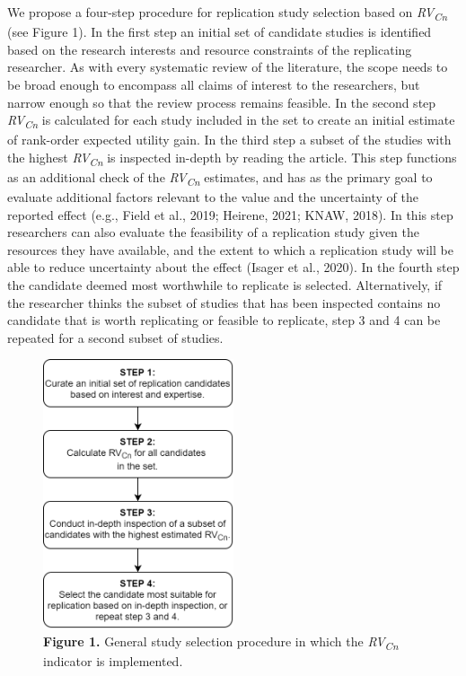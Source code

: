 \documentclass[
  man,floatsintext]{apa6}
\begin{document}
We propose a four-step procedure for replication study selection based on \emph{RV\textsubscript{Cn}} (see Figure 1). In the first step an initial set of candidate studies is identified based on the research interests and resource constraints of the replicating researcher. As with every systematic review of the literature, the scope needs to be broad enough to encompass all claims of interest to the researchers, but narrow enough so that the review process remains feasible. In the second step \emph{RV\textsubscript{Cn}} is calculated for each study included in the set to create an initial estimate of rank-order expected utility gain. In the third step a subset of the studies with the highest \emph{RV\textsubscript{Cn}} is inspected in-depth by reading the article. This step functions as an additional check of the \emph{RV\textsubscript{Cn}} estimates, and has as the primary goal to evaluate additional factors relevant to the value and the uncertainty of the reported effect (e.g., Field et al., 2019; Heirene, 2021; KNAW, 2018). In this step researchers can also evaluate the feasibility of a replication study given the resources they have available, and the extent to which a replication study will be able to reduce uncertainty about the effect (Isager et al., 2020). In the fourth step the candidate deemed most worthwhile to replicate is selected. Alternatively, if the researcher thinks the subset of studies that has been inspected contains no candidate that is worth replicating or feasible to replicate, step 3 and 4 can be repeated for a second subset of studies.

\begin{figure}
\centering
\includegraphics[width=0.5\textwidth,height=\textheight]{Figure_1.png}
\caption{\textbf{Figure 1.} General study selection procedure in which the \emph{RV\textsubscript{Cn}} indicator is implemented.}
\end{figure}
\end{document}
